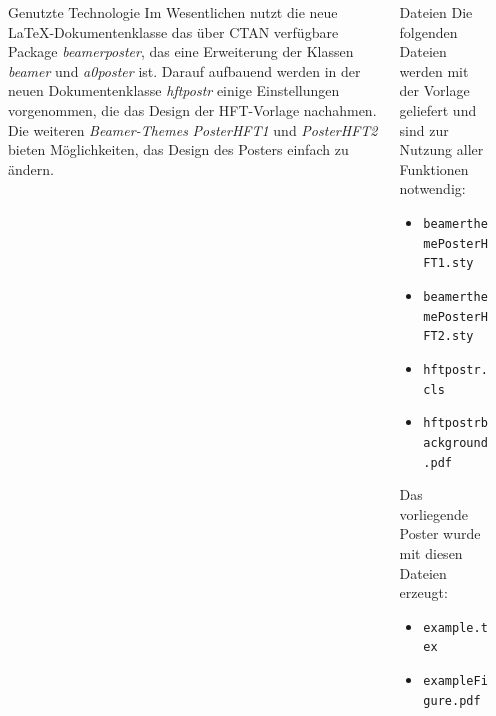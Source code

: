 \documentclass[
  scale = 1.5,
]{hftpostr}
\begin{document}
\begin{frame}[fragile, t]
  \begin{columns}[onlytextwidth, T]
      \begin{column}{.31\textwidth}
        \begin{block}{Genutzte Technologie}
          Im Wesentlichen nutzt die neue \LaTeX-Dokumentenklasse das über CTAN verfügbare Package \textit{beamerposter}, das eine Erweiterung der Klassen \textit{beamer} und \textit{a0poster} ist.
          Darauf aufbauend werden in der neuen Dokumentenklasse \textit{hftpostr} einige Einstellungen vorgenommen, die das Design der HFT-Vorlage nachahmen.
          Die weiteren \textit{Beamer-Themes} \textit{PosterHFT1} und \textit{PosterHFT2} bieten Möglichkeiten, das Design des Posters einfach zu ändern.
        \end{block}
      \end{column}
      \begin{column}{.31\textwidth}
        \begin{block}{Dateien}
          Die folgenden Dateien werden mit der Vorlage geliefert und sind zur Nutzung aller Funktionen notwendig:
          \begin{itemize}
            \item \texttt{beamerthemePosterHFT1.sty}
            \item \texttt{beamerthemePosterHFT2.sty}
            \item \texttt{hftpostr.cls}
            \item \texttt{hftpostrbackground.pdf}
          \end{itemize}
          Das vorliegende Poster wurde mit diesen Dateien erzeugt:
          \begin{itemize}
            \item \texttt{example.tex}
            \item \texttt{exampleFigure.pdf}
          \end{itemize}
        \end{block}
      \end{column}
      \begin{column}{.31\textwidth}
      \end{column}
  \end{columns}


\end{frame}
\end{document}
